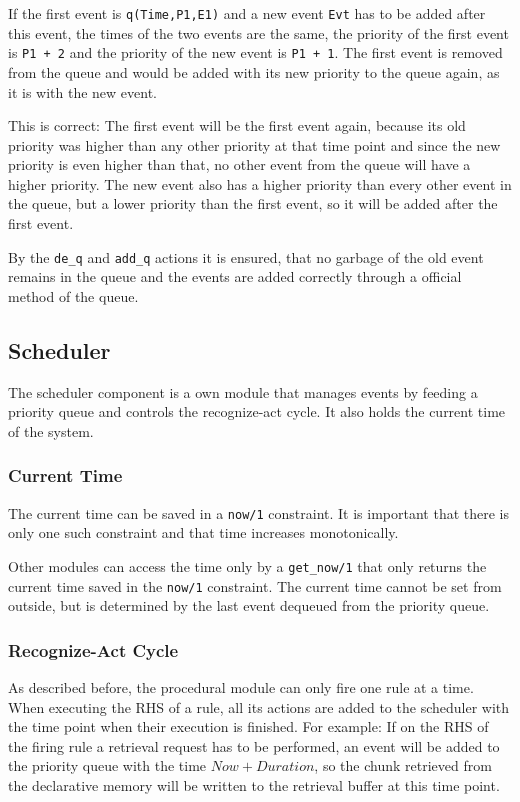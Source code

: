If the first event is \verb|q(Time,P1,E1)| and a new event \verb|Evt| has to be added after this event, the times of the two events are the same, the priority of the first event is \verb|P1 + 2| and the priority of the new event is \verb|P1 + 1|. The first event is removed from the queue and would be added with its new priority to the queue again, as it is with the new event. 

This is correct: The first event will be the first event again, because its old priority was higher than any other priority at that time point and since the new priority is even higher than that, no other event from the queue will have a higher priority. The new event also has a higher priority than every other event in the queue, but a lower priority than the first event, so it will be added after the first event.

By the \verb|de_q| and \verb|add_q| actions it is ensured, that no garbage of the old event remains in the queue and the events are added correctly through a official method of the queue.

\subsection{Scheduler}

The scheduler component is a own module that manages events by feeding a priority queue and controls the recognize-act cycle. It also holds the current time of the system. 

\subsubsection{Current Time}

The current time can be saved in a \verb|now/1| constraint. It is important that there is only one such constraint and that time increases monotonically.

Other modules can access the time only by a \verb|get_now/1| that only returns the current time saved in the \verb|now/1| constraint. The current time cannot be set from outside, but is determined by the last event dequeued from the priority queue.

\subsubsection{Recognize-Act Cycle}

As described before, the procedural module can only fire one rule at a time. When executing the RHS of a rule, all its actions are added to the scheduler with the time point when their execution is finished. For example: If on the RHS of the firing rule a retrieval request has to be performed, an event will be added to the priority queue with the time $Now + Duration$, so the chunk retrieved from the declarative memory will be written to the retrieval buffer at this time point.

